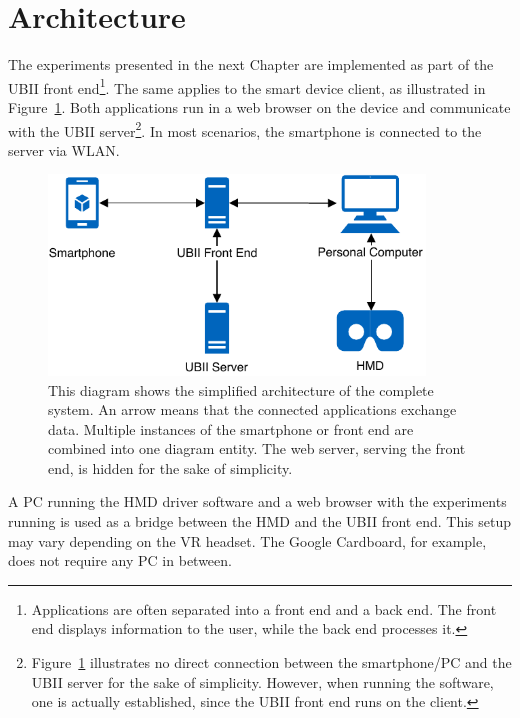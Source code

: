 \section{Architecture}\label{section:architecture}

The experiments presented in the next Chapter are implemented as part of the \gls{UBII} front end\footnote{Applications are often separated into a front end and a back end. The front end displays information to the user, while the back end processes it.}. The same applies to the smart device client, as illustrated in Figure~\ref{fig:architecture}. Both applications run in a web browser on the device and communicate with the \gls{UBII} server\footnote{Figure~\ref{fig:architecture} illustrates no direct connection between the smartphone/\gls{PC} and the \gls{UBII} server for the sake of simplicity. However, when running the software, one is actually established, since the \gls{UBII} front end runs on the client.}. In most scenarios, the smartphone is connected to the server via \gls{WLAN}.

\begin{figure}[H]
  \centering
  \includegraphics[width=10cm]{figures/implementation/architecture.pdf}
  \caption[The system architecture]{This diagram shows the simplified architecture of the complete system. An arrow means that the connected applications exchange data. Multiple instances of the smartphone or front end are combined into one diagram entity. The web server, serving the front end, is hidden for the sake of simplicity. }\label{fig:architecture}
\end{figure}

A \gls{PC} running the \gls{HMD} driver software and a web browser with the experiments running is used as a bridge between the \gls{HMD} and the \gls{UBII} front end. This setup may vary depending on the \gls{VR} headset. The Google Cardboard, for example, does not require any \gls{PC} in between.

